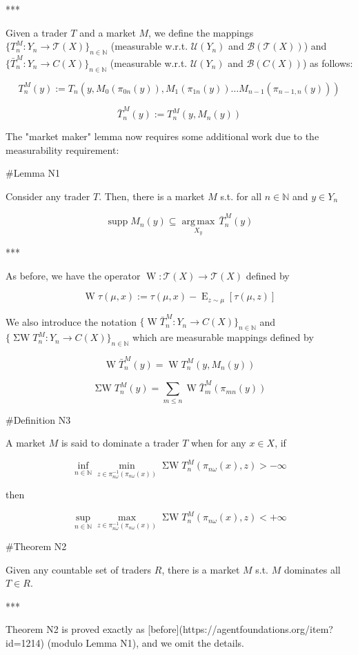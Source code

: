 \documentclass[a4paper]{article}
\DeclareMathOperator{\Supp}{supp}
\DeclareMathOperator{\E}{E}
\newcommand{\Argmax}[1]{\underset{#1}{\operatorname{arg\,max}}\,}
\newcommand{\Nats}{\mathbb{N}}
\newcommand{\T}{\mathcal{T}}
\newcommand{\B}{\mathcal{B}}
\newcommand{\UM}{\mathcal{U}}
\newcommand{\W}{\operatorname{W}}
\newcommand{\SW}{\operatorname{\Sigma W}}
\begin{document}
***

Given a trader ${T}$ and a market ${M}$, we define the mappings ${\{T^M_n: Y_n \rightarrow \T(X)\}_{n \in \Nats}}$ (measurable w.r.t. ${\UM(Y_n)}$ and ${\B(\T(X))}$) and ${\{\bar{T}^M_n: Y_n \rightarrow C(X)\}_{n \in \Nats}}$ (measurable w.r.t. ${\UM(Y_n)}$ and ${\B(C(X))}$) as follows:

$$T^M_n(y):= T_n(y, M_0(\pi_{0n}(y)),M_1(\pi_{1n}(y)) \ldots M_{n-1}(\pi_{n-1,n}(y)))$$

$$\bar{T}^M_n(y):= T^M_n(y,M_n(y))$$

The "market maker" lemma now requires some additional work due to the measurability requirement:

\#Lemma N1

Consider any trader ${T}$. Then, there is a market ${M}$ s.t. for all ${n \in \Nats}$ and ${y \in Y_n}$

$$\Supp M_n(y) \subseteq \Argmax{X_y} \bar{T}^M_n(y)$$

***

As before, we have the operator ${\W: \T(X) \rightarrow \T(X)}$ defined by 

$$\W \tau(\mu,x):= \tau(\mu,x) - \E_{z \sim \mu}[\tau(\mu,z)]$$

We also introduce the notation ${\{\W \bar{T}^M_n: Y_n \rightarrow C(X)\}_{n \in \Nats}}$ and ${\{\SW T^M_n: Y_n \rightarrow C(X)\}_{n \in \Nats}}$ which are measurable mappings defined by

$$\W \bar{T}^M_n(y) = \W T^M_n(y, M_n(y))$$

$$\SW T^M_n(y) = \sum_{m \leq n} \W \bar{T}^M_m(\pi_{mn}(y))$$

\#Definition N3

A market ${M}$ is said to dominate a trader ${T}$ when for any ${x \in X}$, if

$$\inf_{n \in \Nats} \min_{z \in \pi_{n\omega}^{-1}(\pi_{n\omega}(x))} \SW T^M_n(\pi_{n\omega}(x),z) > -\infty$$

then

$$\sup_{n \in \Nats} \max_{z \in \pi_{n\omega}^{-1}(\pi_{n\omega}(x))} \SW T^M_n(\pi_{n\omega}(x),z) < +\infty$$

\#Theorem N2

Given any countable set of traders $R$, there is a market ${M}$ s.t. ${M}$ dominates all ${T \in R}$.

***

Theorem N2 is proved exactly as [before](https://agentfoundations.org/item?id=1214) (modulo Lemma N1), and we omit the details.
\end{document}

